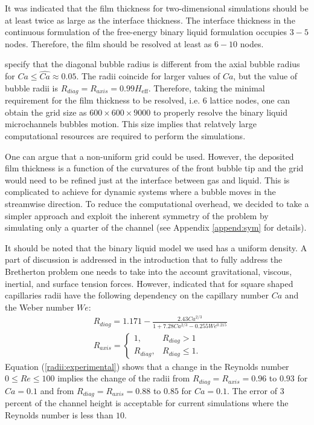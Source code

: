 \documentclass{article}
\begin{document}
It was indicated \cite{kuzmin-binary2d} that the film thickness for two-dimensional simulations should be at least twice as large
as the interface thickness. The interface thickness in the continuous formulation of the
free-energy binary liquid formulation occupies $3-5$ nodes. Therefore, the film should be
resolved at least as $6-10$ nodes. 

\cite{heil-threedim} specify that the diagonal bubble radius is different from the
axial bubble radius for $Ca\leq \widehat{Ca}\approx 0.05$. The radii coincide for larger values of
$Ca$, but the value of bubble radii is $R_{diag}=R_{axis}=0.99 H_{\mathrm{eff}}$. Therefore, taking the minimal requirement for the film thickness to be
resolved, i.e. $6$ lattice nodes, one can obtain the grid size as $600\times 600 \times 9000 $ to
properly resolve the binary liquid microchannels bubbles motion. This size implies that relatvely large
computational resources are required to perform the simulations.

One can argue that a non-uniform grid could be used. However, the deposited film thickness is a
function of the curvatures of the front bubble tip \cite{bretherton} and the grid would need to
be refined just at the interface between gas and liquid. This is complicated to achieve for
dynamic systems where a bubble moves in the streamwise direction.
To reduce the computational overhead, we decided to take a simpler approach and exploit the
inherent symmetry of the problem by simulating only a quarter of the channel (see Appendix
\ref{append:sym} for details).

It should be noted that the binary liquid model we used has a uniform density. A part of discussion is
addressed in the introduction that to fully address the Bretherton problem one needs to take into
the account gravitational, viscous, inertial, and surface tension forces. However, 
\citet{shikazono-square} indicated that for square shaped capillaries radii have the
following dependency on the capillary number $Ca$ and the Weber number $We$:
\begin{equation}
\label{radii:experimental}
\begin{aligned}
&R_{diag}=1.171-\frac{2.43 Ca^{2/3}}{1+7.28 Ca^{2/3}-0.255 We^{0.215}}\\
&R_{axis}=
\begin{cases}
1, &R_{diag}>1\\
R_{diag}, &R_{diag}\leq 1.
\end{cases}
\end{aligned}
\end{equation}
Equation (\ref{radii:experimental}) shows that a change in the Reynolds number $0\leq Re \leq 100$
implies the change of the radii from $R_{diag}=R_{axis}=0.96$ to $0.93$ for $Ca=0.1$ and from
$R_{diag}=R_{axis}=0.88$ to $0.85$ for $Ca=0.1$. The error of $3$ percent of the channel height is
acceptable for current simulations where the Reynolds number is less than $10$.
\end{document}
